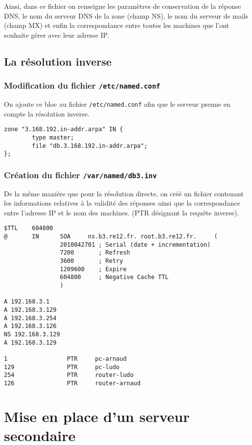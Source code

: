 \documentclass[12pt,a4paper,notitlepage]{article}
\begin{document}
Ainsi, dans ce fichier on renseigne les paramètres de conservation de la réponse DNS,  le nom du serveur DNS de la zone (champ NS), le nom du serveur de mails (champ MX) et enfin la correspondance entre toutes les machines que l'ont souhaite gérer avec leur adresse IP. 

\clearpage
\subsection{La résolution inverse}

\subsubsection{Modification du fichier \texttt{/etc/named.conf}}

On ajoute ce bloc au fichier \texttt{/etc/named.conf} afin que le serveur prenne en compte la résolution inverse.

\begin{lstlisting}[title=Ajout de la zone inverse à gérer]
zone "3.168.192.in-addr.arpa" IN {
        type master;
        file "db.3.168.192.in-addr.arpa";
};
\end{lstlisting}

\subsubsection{Création du fichier \texttt{/var/named/db3.inv}}
De la même manière que pour la résolution directe, on créé un fichier contenant les informations relatives à la validité des réponses ainsi que la correspondance entre l'adresse IP et le nom des machines. (PTR désignant la requête inverse).
\begin{lstlisting}[title=Paramètres de la zone inverse]
$TTL    604800
@       IN      SOA     ns.b3.re12.fr. root.b3.re12.fr.     (
                2010042701 ; Serial (date + incrementation)
                7200       ; Refresh
                3600       ; Retry
                1209600    ; Expire
                604800     ; Negative Cache TTL
                )

A 192.168.3.1
A 192.168.3.129
A 192.168.3.254
A 192.168.3.126
NS 192.168.3.129
A 192.168.3.129

1                 PTR     pc-arnaud
129               PTR     pc-ludo
254               PTR     router-ludo
126               PTR     router-arnaud
\end{lstlisting}


\clearpage
\section{Mise en place d'un serveur secondaire}
\end{document}
